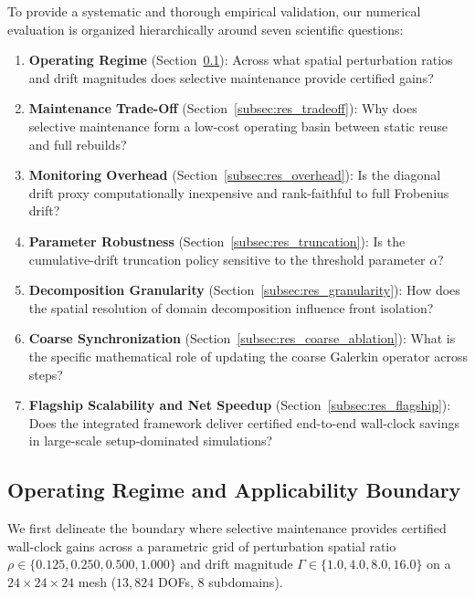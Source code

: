 \documentclass[preprint,12pt,3p]{elsarticle}
\begin{document}
To provide a systematic and thorough empirical validation, our numerical evaluation is organized hierarchically around seven scientific questions:
\begin{enumerate}
    \item \textbf{Operating Regime} (Section~\ref{subsec:res_regime}): Across what spatial perturbation ratios and drift magnitudes does selective maintenance provide certified gains?
    \item \textbf{Maintenance Trade-Off} (Section~\ref{subsec:res_tradeoff}): Why does selective maintenance form a low-cost operating basin between static reuse and full rebuilds?
    \item \textbf{Monitoring Overhead} (Section~\ref{subsec:res_overhead}): Is the diagonal drift proxy computationally inexpensive and rank-faithful to full Frobenius drift?
    \item \textbf{Parameter Robustness} (Section~\ref{subsec:res_truncation}): Is the cumulative-drift truncation policy sensitive to the threshold parameter $\alpha$?
    \item \textbf{Decomposition Granularity} (Section~\ref{subsec:res_granularity}): How does the spatial resolution of domain decomposition influence front isolation?
    \item \textbf{Coarse Synchronization} (Section~\ref{subsec:res_coarse_ablation}): What is the specific mathematical role of updating the coarse Galerkin operator across steps?
    \item \textbf{Flagship Scalability and Net Speedup} (Section~\ref{subsec:res_flagship}): Does the integrated framework deliver certified end-to-end wall-clock savings in large-scale setup-dominated simulations?
\end{enumerate}

\subsection{Operating Regime and Applicability Boundary}
\label{subsec:res_regime}
We first delineate the boundary where selective maintenance provides certified wall-clock gains across a parametric grid of perturbation spatial ratio $\rho \in \{0.125, 0.250, 0.500, 1.000\}$ and drift magnitude $\Gamma \in \{1.0, 4.0, 8.0, 16.0\}$ on a $24 \times 24 \times 24$ mesh ($13,824$ DOFs, 8 subdomains).
\end{document}
